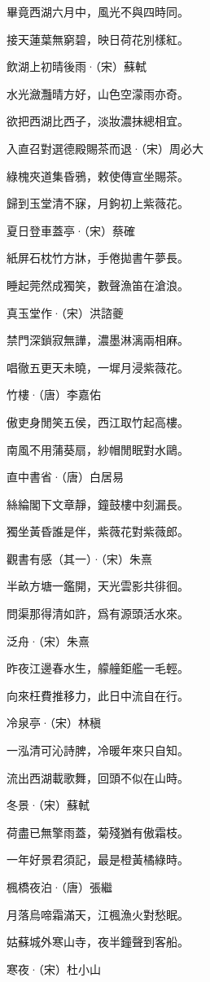 \documentclass[12pt,a4paper]{ctexbook}
\begin{document}
畢竟西湖六月中，風光不與四時同。\par
接天蓮葉無窮碧，映日荷花別樣紅。\par
飲湖上初晴後雨·（宋）蘇軾\par
水光瀲灩晴方好，山色空濛雨亦奇。\par
欲把西湖比西子，淡妝濃抹總相宜。\par
入直召對選德殿賜茶而退·（宋）周必大\par
綠槐夾道集昏鴉，敕使傳宣坐賜茶。\par
歸到玉堂清不寐，月鉤初上紫薇花。\par
夏日登車蓋亭·（宋）蔡確\par
紙屏石枕竹方牀，手倦拋書午夢長。\par
睡起莞然成獨笑，數聲漁笛在滄浪。\par
真玉堂作·（宋）洪諮夔\par
禁門深鎖寂無譁，濃墨淋漓兩相麻。\par
唱徹五更天未曉，一墀月浸紫薇花。\par
竹樓·（唐）李嘉佑\par
傲吏身閒笑五侯，西江取竹起高樓。\par
南風不用蒲葵扇，紗帽閒眠對水鷗。\par
直中書省·（唐）白居易\par
絲綸閣下文章靜，鐘鼓樓中刻漏長。\par
獨坐黃昏誰是伴，紫薇花對紫薇郎。\par
觀書有感（其一）·（宋）朱熹\par
半畝方塘一鑑開，天光雲影共徘徊。\par
問渠那得清如許，爲有源頭活水來。\par
泛舟·（宋）朱熹\par
昨夜江邊春水生，艨艟鉅艦一毛輕。\par
向來枉費推移力，此日中流自在行。\par
冷泉亭·（宋）林稹\par
一泓清可沁詩脾，冷暖年來只自知。\par
流出西湖載歌舞，回頭不似在山時。\par
冬景·（宋）蘇軾\par
荷盡已無擎雨蓋，菊殘猶有傲霜枝。\par
一年好景君須記，最是橙黃橘綠時。\par
楓橋夜泊·（唐）張繼\par
月落烏啼霜滿天，江楓漁火對愁眠。\par
姑蘇城外寒山寺，夜半鐘聲到客船。\par
寒夜·（宋）杜小山\par
\end{document}
